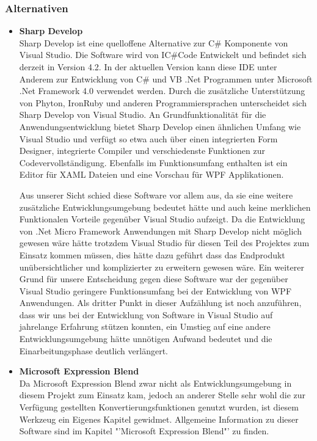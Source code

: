 \subsubsection{Alternativen}
\begin{itemize}
\item \textbf{Sharp Develop}\\
Sharp Develop ist eine quelloffene Alternative zur C\# Komponente von Visual Studio. Die Software wird von IC\#Code Entwickelt und befindet sich derzeit in Version 4.2.
In der aktuellen Version kann diese IDE unter Anderem zur Entwicklung von C\# und VB .Net Programmen unter Microsoft .Net Framework 4.0 verwendet werden. Durch die zusätzliche Unterstützung von Phyton, IronRuby und anderen Programmiersprachen unterscheidet sich Sharp Develop von Visual Studio.
An Grundfunktionalität für die Anwendungsentwicklung bietet Sharp Develop einen ähnlichen Umfang wie Visual Studio und verfügt so etwa auch über einen integrierten Form Designer, integrierte Compiler und verschiedenste Funktionen zur Codevervollständigung. Ebenfalls im Funktionsumfang enthalten ist ein Editor für XAML Dateien und eine Vorschau für WPF Applikationen.

Aus unserer Sicht schied diese Software vor allem aus, da sie eine weitere zusätzliche Entwicklungsumgebung bedeutet hätte und auch keine merklichen Funktionalen Vorteile gegenüber Visual Studio aufzeigt.
Da die Entwicklung von .Net Micro Framework Anwendungen mit Sharp Develop nicht möglich gewesen wäre hätte trotzdem Visual Studio für diesen Teil des Projektes zum Einsatz kommen müssen, dies hätte dazu geführt dass das Endprodukt unübersichtlicher und komplizierter zu erweitern gewesen wäre.
Ein weiterer Grund für unsere Entscheidung gegen diese Software war der gegenüber Visual Studio geringere Funktionsumfang bei der Entwicklung von WPF Anwendungen.
Als dritter Punkt in dieser Aufzählung ist noch anzuführen, dass wir uns bei der Entwicklung von Software in Visual Studio auf jahrelange Erfahrung stützen konnten, ein Umstieg auf eine andere Entwicklungsumgebung hätte unnötigen Aufwand bedeutet und die Einarbeitungsphase deutlich verlängert.
\item \textbf{Microsoft Expression Blend}\\
Da Microsoft Expression Blend zwar nicht als Entwicklungsumgebung in diesem Projekt zum Einsatz kam, jedoch an anderer Stelle sehr wohl die zur Verfügung gestellten Konvertierungsfunktionen genutzt wurden, ist diesem Werkzeug ein Eigenes Kapitel gewidmet. Allgemeine Information zu dieser Software sind im Kapitel "'Microsoft Expression Blend"' zu finden.


\end{itemize}
